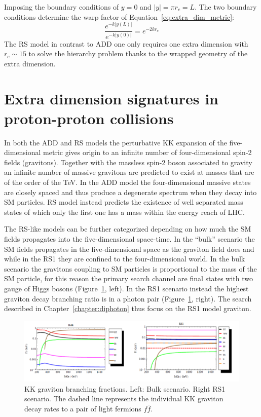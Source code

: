 Imposing the boundary conditions of $y = 0$ and $|y| = \pi r_c = L$.
The two boundary conditions determine the warp factor of Equation~\ref{eq:extra_dim_metric}:
\[
  \frac{e^{-k|y(L)|}}{e^{-k|y(0)|}} = e^{-2kr_c}
\]
The RS model in contrast to ADD one only requires one extra dimension with $r_c \sim 15$ to solve the
hierarchy problem thanks to the wrapped geometry of the extra dimension.

\section{Extra dimension signatures in proton-proton collisions}
In both the ADD and RS models the perturbative KK expansion of the five-dimensional metric
gives origin to an infinite number of four-dimensional spin-2 fields (gravitons). Together with
the massless spin-2 boson associated to gravity an infinite number of massive gravitons are predicted to exist
at masses that are of the order of the TeV.
In the ADD model the four-dimensional massive states
are closely spaced and thus produce a degenerate spectrum when they decay into SM particles.
RS model instead predicts the existence of well separated mass states of which only the first one has a mass
within the energy reach of LHC.

The RS-like models can be further categorized depending on how much the SM fields propagates into the five-dimensional
space-time. In the ``bulk'' scenario the SM fields propagates in the five-dimensional space as the graviton field does
and while in the RS1 they are confined to the four-dimensional world.
In the bulk scenario the gravitons coupling to SM particles is proportional to the mass of the SM particle, for this
reason the primary search channel are final states with two gauge of Higgs bosons (Figure~\ref{fig:rs_coup}, left).
In the RS1 scenario instead the highest graviton decay branching ratio is in a photon pair (Figure~\ref{fig:rs_coup}, right).
The search described in Chapter~\ref{chapter:diphoton} thus focus on the RS1 model graviton.
\begin{figure}[ht!]
  \centering
  \includegraphics[width = 1.\textwidth]{figures/introduction/rs_coup.png}
  \caption{
    KK graviton branching fractions. Left: Bulk scenario. Right RS1 scenario.
    The dashed line represents the individual KK graviton decay rates to a pair of
    light fermions $f\bar{f}$.}
  \label{fig:rs_coup}
\end{figure}

